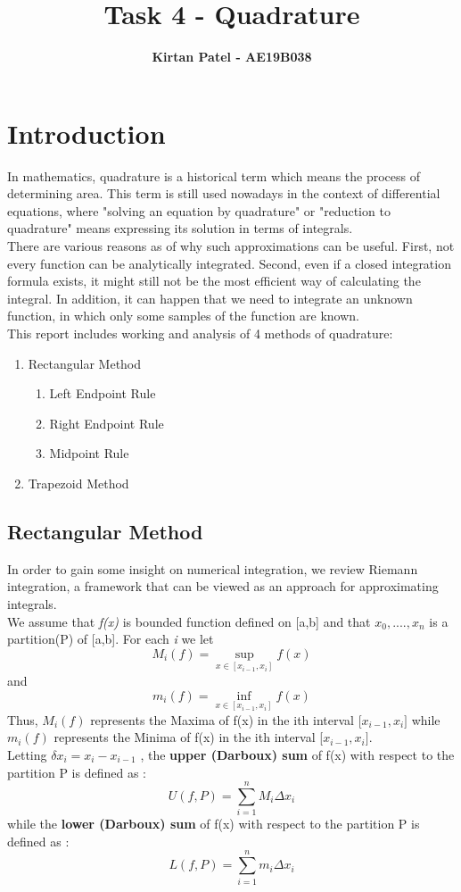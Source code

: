 \documentclass[11pt]{article}
\title{\LARGE{\bf{Task 4 - Quadrature}}}
\author{\Large{\bf{Kirtan Patel - AE19B038}}}
\date{}
\begin{document}
\maketitle 

\section{Introduction}
In mathematics, quadrature is a historical term which means the process of determining area. This term is still used nowadays in the context of differential equations, where "solving an equation by quadrature" or "reduction to quadrature" means expressing its solution in terms of integrals.\\

There are various reasons as of why such approximations
can be useful. First, not every function can be analytically integrated. Second, even if a
closed integration formula exists, it might still not be the most efficient way of calculating
the integral. In addition, it can happen that we need to integrate an unknown function,
in which only some samples of the function are known.\\

This report includes working and analysis of 4 methods of quadrature:
\begin{enumerate}
	\item Rectangular Method
	\begin{enumerate}
		\item Left Endpoint Rule
		\item Right Endpoint Rule
		\item Midpoint Rule
	\end{enumerate}
	\item Trapezoid Method
\end{enumerate}

\subsection{Rectangular Method}
In order to gain some insight on numerical integration, we review Riemann integration, a framework that can be viewed as an approach for approximating integrals.\\

We assume that \textit{f(x)} is bounded function defined on [a,b] and that {$x_0, . . . . ,x_n$} is a partition(P) of [a,b]. For each \textit{i} we let
\[ M_i(f) = \mathop{sup}_{x\in[x_{i-1},x_i]} f(x)\] and \[m_i(f) = \mathop{inf}_{x\in[x_{i-1},x_i]} f(x)\]
Thus, $M_i(f)$ represents the Maxima of f(x) in the ith interval [$x_{i-1},x_{i}]$ while $m_i(f)$ represents the Minima of f(x) in the ith interval [$x_{i-1},x_{i}]$.\\
Letting $\delta x_i = x_i - x_{i-1}$ , the \textbf{upper (Darboux) sum} of f(x) with respect to the partition P is defined as : 
\[ U(f,P) = \sum_{i=1}^{n}M_i\Delta x_i\] 
while the \textbf{lower (Darboux) sum} of f(x) with respect to the partition P is defined as : 
\[ L(f,P) = \sum_{i=1}^{n}m_i\Delta x_i\] \\
\end{document}
